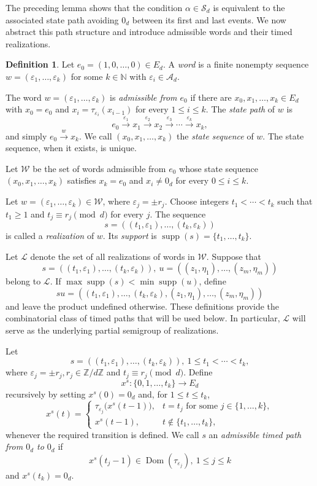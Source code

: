 \documentclass[11pt]{amsart}
\theoremstyle{definition}
\newtheorem{definition}[theorem]{Definition}
\theoremstyle{remark}
\newcommand{\Z}{\mathbb Z}
\newcommand{\Sd}{\mathcal S_d}
\newcommand{\cL}{\mathcal L}
\newcommand{\cW}{\mathcal W}
\newcommand{\supp}{\operatorname{supp}}
\begin{document}
The preceding lemma shows that the condition $\alpha\in\Sd$ is equivalent to the associated state path avoiding $0_d$ between its first and last events. We now abstract this path structure and introduce admissible words and their timed realizations.


\begin{definition}
Let $e_0=(1,0,\ldots,0)\in E_d$.
A \emph{word} is a finite nonempty sequence
$w=(\varepsilon_1,\ldots,\varepsilon_k)$ for some $k\in \mathbb{N} $ with $\varepsilon_i\in\mathcal A_d$.  

The word $w=(\varepsilon_1,\ldots,\varepsilon_k)$ is \emph{admissible from $e_0$} if there are 
$x_0,x_1,\ldots,x_k\in E_d$ with $x_0=e_0$ and
$x_i=\tau_{\varepsilon_i}(x_{i-1})$ for every $1\leq i\leq k$.
 The \emph{state path} of $w$ is
\[
 e_0 \xrightarrow{\varepsilon_1 } x_1 \xrightarrow{\varepsilon_2 }x_2\xrightarrow{\varepsilon_3 } \cdots 
 \xrightarrow{\varepsilon_k } x_k,
\]
and simply $e_0 \xrightarrow{ w } x_k$.
We call $(x_0, x_1, \ldots, x_k)$ the \emph{state sequence} of $w$. The state sequence, when it exists, is unique.

Let $\cW$ be the set of words admissible from $e_0$ whose state sequence $(x_0, x_1, \ldots, x_k)$
satisfies $x_k=e_0$ and $x_i\neq0_d$ for every $0\leq i\leq k$.

Let $w=(\varepsilon_1,\ldots,\varepsilon_k)\in\cW$, where
$\varepsilon_j=\pm r_j$.  Choose integers $t_1<\cdots<t_k$ such that
$t_1\geq1$ and $t_j\equiv r_j\pmod d$ for every $j$.  The sequence
\[
 s=((t_1,\varepsilon_1),\ldots,(t_k,\varepsilon_k))
\]
is called a \emph{realization} of $w$.
Its \emph{support} is $\supp(s)=\{t_1,\ldots,t_k\}$.

Let $\cL$ denote the set of all realizations of words in $\cW$.  Suppose that
\[
 s=((t_1,\varepsilon_1),\ldots,(t_k,\varepsilon_k)),
 \ 
 u=((z_1,\eta_1),\ldots,(z_m,\eta_m))
\]
belong to $\cL$.  If $\max\supp(s)<\min\supp(u)$, define
\[
 su=((t_1,\varepsilon_1),\ldots,(t_k,\varepsilon_k),
     (z_1,\eta_1),\ldots,(z_m,\eta_m))
\]
and leave the product undefined otherwise.
These definitions provide the combinatorial class of timed paths that will be used below. In particular, $\mathcal L$ will serve as the underlying partial semigroup of realizations.



\end{definition}

Let
\[
 s=((t_1,\varepsilon_1),\ldots,(t_k,\varepsilon_k)),
 \ 1\leq t_1<\cdots<t_k,
\]
where $\varepsilon_j=\pm r_j, r_j\in \Z/ d\Z$ and $t_j\equiv r_j\pmod d$.  
Define
$$
x^s:\{0,1,\ldots,t_k\}\longrightarrow E_d
$$
recursively by setting $x^s(0)=0_d$ and, for $1\le t\le t_k$,
$$
x^s(t)=\begin{cases}
\tau_{\varepsilon_j}\bigl(x^s(t-1)\bigr),
& t=t_j\text{ for some }j\in\{1,\ldots,k\},\\[2mm]
x^s(t-1),
& t\notin\{t_1,\ldots,t_k\},
\end{cases}
$$
whenever the required transition is defined.
 We call $s$ an \emph{admissible timed path from $0_d$ to $0_d$} if 
\[
 x^s(t_j-1)\in\operatorname{Dom}(\tau_{\varepsilon_j}), \ 
  1\leq j\leq k 
\]
and $x^s(t_k)=0_d$.
\end{document}
